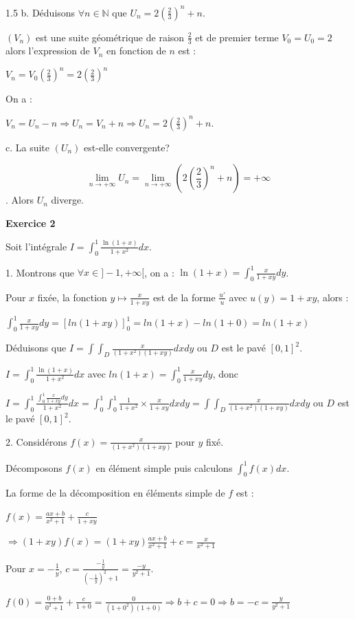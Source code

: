 \documentclass[12pt]{article}
\begin{document}
\begin{spacing}{1.5}
b. Déduisons $\forall {n\in \mathbb{N}}$ que $U_n = 2(\frac{2}{3})^n + n$.

$(V_n)$ est une suite géométrique de raison $\frac{2}{3}$ et de premier terme $V_0=U_0=2$ alors l'expression de $V_n$ en fonction de $n$ est :

$V_n=V_0(\frac{2}{3})^n=2(\frac{2}{3})^n$

On a :

$V_n =U_n-n\Rightarrow U_n =V_n+n\Rightarrow U_n = 2(\frac{2}{3})^n + n$.


c. La suite $(U_n)$ est-elle convergente?

\[\lim_{n\to +\infty}U_n = \lim_{n\to +\infty}(2(\frac{2}{3})^n + n)=+\infty\]. Alors $U_n$ diverge.

\medskip
\textbf{Exercice 2}

Soit l'intégrale $I=\int_{0}^{1}\frac{\ln(1 + x)}{1 + x^2}dx$.

1. Montrons que $\forall {x\in ]-1,+\infty[}$, on a : $\ln(1+x) = \int_{0}^{1}\frac{x}{1 + xy}dy$.

Pour $x$ fixée, la fonction $y\longmapsto \frac{x}{1 + xy}$ est de la forme $\frac{u'}{u}$ avec $u(y)=1+xy$, alors : 

$\int_{0}^{1}\frac{x}{1 + xy}dy=[ln(1+xy)]_0^1=ln(1+x)-ln(1+0)=ln(1+x)$


Déduisons que $I = \int\int_D\frac{x}{(1+x^2)(1+xy)}dxdy$ ou  $D$ est le pavé $[0,1]^2$.


$I=\int_{0}^{1}\frac{\ln(1 + x)}{1 + x^2}dx$ avec $ln(1+x)=\int_{0}^{1}\frac{x}{1 + xy}dy$, donc 

$I=\int_{0}^{1}\frac{\int_{0}^{1}\frac{x}{1 + xy}dy}{1 + x^2}dx=\int_{0}^{1}\int_{0}^{1}\frac{1}{1 + x^2}\times\frac{x}{1 + xy}dxdy=\int\int_D\frac{x}{(1+x^2)(1+xy)}dxdy$ ou  $D$ est le pavé $[0,1]^2$.


2. Considérons $f(x)= \frac{x}{(1+x^2)(1+xy)}$ pour $y$ fixé.

Décomposons $f(x)$ en élément simple puis calculons $\int_{0}^{1}f(x)dx$.

La forme de la décomposition en éléments simple de $f$ est :

$f(x)=\frac{ax+b}{x^2+1}+\frac{c}{1+xy}$

$\Rightarrow (1+xy)f(x)=(1+xy)\frac{ax+b}{x^2+1}+c=\frac{x}{x^2+1}$

Pour $x=-\frac{1}{y}$, $c=\frac{-\frac{1}{y}}{(-\frac{1}{y})^2+1}=\frac{-y}{y^2+1}$.

$f(0)=\frac{0+b}{0^2+1}+\frac{c}{1+0}=\frac{0}{(1+0^2)(1+0)}\Longrightarrow b+c=0\Longrightarrow b=-c=\frac{y}{y^2+1}$


\end{spacing}
\end{document}
